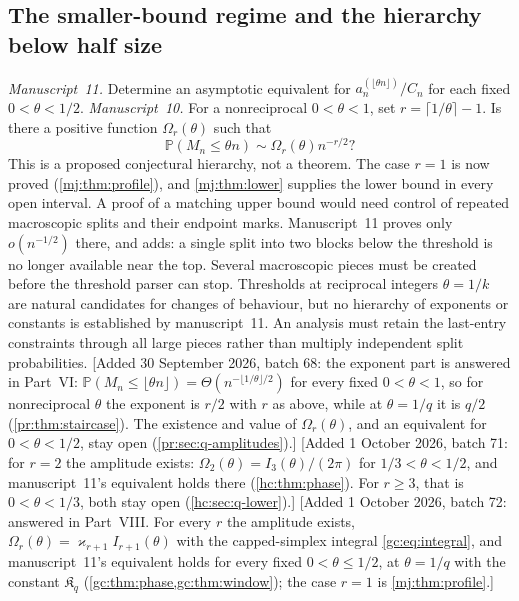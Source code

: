 \documentclass[11pt,a4paper]{article}
\theoremstyle{definition}\newaliascnt{definition}{theorem}
\theoremstyle{remark}\newaliascnt{remark}{theorem}
\newcommand{\ljP}{\mathbb P}
\begin{document}
\subsection{The smaller-bound regime and the hierarchy below half size}
\label{mj:sec:q-hierarchy}
\emph{Manuscript~11.} Determine an asymptotic equivalent for
$a_n^{(\lfloor\theta n\rfloor)}/C_n$ for each fixed $0<\theta<1/2$.
\emph{Manuscript~10.} For a nonreciprocal $0<\theta<1$, set
$r=\lceil1/\theta\rceil-1$. Is there a positive function $\Omega_r(\theta)$
such that
\[
 \ljP(M_n\le\theta n)\sim\Omega_r(\theta)n^{-r/2}?
\]
This is a proposed conjectural hierarchy, not a theorem. The case $r=1$ is
now proved (\cref{mj:thm:profile}), and \cref{mj:thm:lower} supplies the
lower bound in every open interval. A proof of a matching upper bound would
need control of repeated macroscopic splits and their endpoint marks.
Manuscript~11 proves only $o(n^{-1/2})$ there, and adds: a single split into
two blocks below the threshold is no longer available near the top. Several
macroscopic pieces must be created before the threshold parser can stop.
Thresholds at reciprocal integers $\theta=1/k$ are natural candidates for
changes of behaviour, but no hierarchy of exponents or constants is
established by manuscript~11. An analysis must retain the last-entry
constraints through all large pieces rather than multiply independent split
probabilities.
[Added 30 September 2026, batch 68: the exponent part is answered in
Part~VI: $\ljP(M_n\le\lfloor\theta n\rfloor)=\Theta(n^{-\lfloor1/\theta\rfloor/2})$
for every fixed $0<\theta<1$, so for nonreciprocal $\theta$ the exponent is
$r/2$ with $r$ as above, while at $\theta=1/q$ it is $q/2$
(\cref{pr:thm:staircase}). The existence and value of $\Omega_r(\theta)$, and
an equivalent for $0<\theta<1/2$, stay open (\cref{pr:sec:q-amplitudes}).]
[Added 1 October 2026, batch 71: for $r=2$ the amplitude exists:
$\Omega_2(\theta)=I_3(\theta)/(2\pi)$ for $1/3<\theta<1/2$, and
manuscript~11's equivalent holds there (\cref{hc:thm:phase}). For $r\ge3$,
that is $0<\theta<1/3$, both stay open (\cref{hc:sec:q-lower}).]
[Added 1 October 2026, batch 72: answered in Part~VIII. For every $r$ the
amplitude exists, $\Omega_r(\theta)=\varkappa_{r+1}I_{r+1}(\theta)$ with the
capped-simplex integral \eqref{gc:eq:integral}, and manuscript~11's equivalent
holds for every fixed $0<\theta\le1/2$, at $\theta=1/q$ with the constant
$\mathfrak K_q$ (\cref{gc:thm:phase,gc:thm:window}); the case $r=1$ is
\cref{mj:thm:profile}.]
\end{document}
